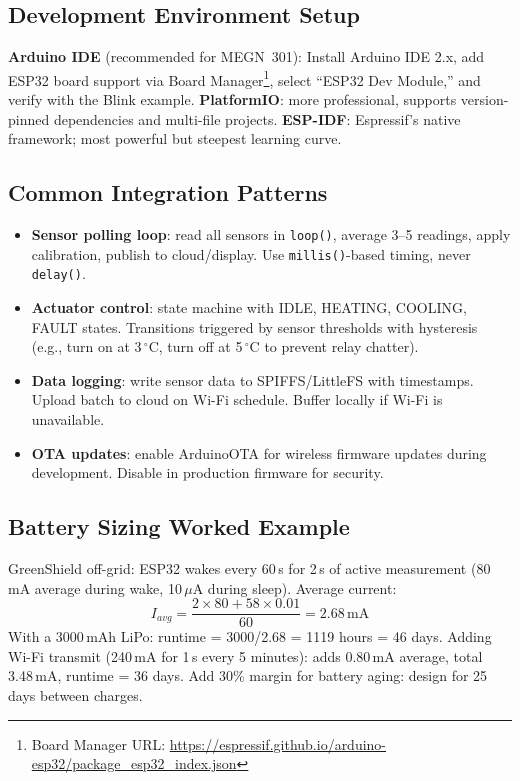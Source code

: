 \documentclass[11pt,letterpaper,twoside,openany]{book}
\newcommand{\degC}{\ensuremath{{}^{\circ}\text{C}}}
\begin{document}
\subsection{Development Environment Setup}
\textbf{Arduino IDE} (recommended for MEGN~301): Install Arduino IDE 2.x, add ESP32 board support via Board Manager\footnote{Board Manager URL: \url{https://espressif.github.io/arduino-esp32/package_esp32_index.json}}, select ``ESP32 Dev Module,'' and verify with the Blink example. \textbf{PlatformIO}: more professional, supports version-pinned dependencies and multi-file projects. \textbf{ESP-IDF}: Espressif's native framework; most powerful but steepest learning curve.

\subsection{Common Integration Patterns}
\begin{itemize}[leftmargin=1.5em]
\item \textbf{Sensor polling loop}: read all sensors in \texttt{loop()}, average 3--5 readings, apply calibration, publish to cloud/display. Use \texttt{millis()}-based timing, never \texttt{delay()}.
\item \textbf{Actuator control}: state machine with IDLE, HEATING, COOLING, FAULT states. Transitions triggered by sensor thresholds with hysteresis (e.g., turn on at 3\,\degC{}, turn off at 5\,\degC{} to prevent relay chatter).
\item \textbf{Data logging}: write sensor data to SPIFFS/LittleFS with timestamps. Upload batch to cloud on Wi-Fi schedule. Buffer locally if Wi-Fi is unavailable.
\item \textbf{OTA updates}: enable ArduinoOTA for wireless firmware updates during development. Disable in production firmware for security.
\end{itemize}

\subsection{Battery Sizing Worked Example}
GreenShield off-grid: ESP32 wakes every 60\,s for 2\,s of active measurement (80\,mA average during wake, 10\,$\mu$A during sleep). Average current:
\begin{equation}
I_{avg} = \frac{2 \times 80 + 58 \times 0.01}{60} = 2.68\,\text{mA}
\end{equation}
With a 3000\,mAh LiPo: runtime = 3000/2.68 = 1119 hours = 46 days. Adding Wi-Fi transmit (240\,mA for 1\,s every 5 minutes): adds 0.80\,mA average, total 3.48\,mA, runtime = 36 days. Add 30\% margin for battery aging: design for 25 days between charges.
\end{document}
